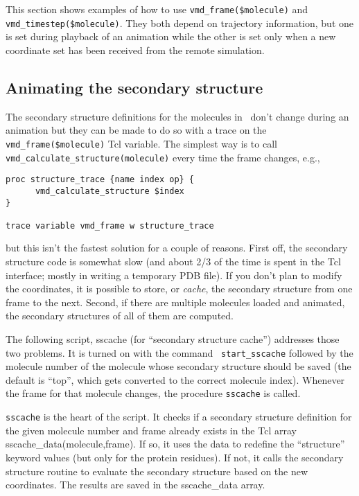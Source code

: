 This section shows examples of how to use {\tt vmd\_frame(\$molecule)}
and {\tt vmd\_timestep(\$molecule)}. 
They both depend
on trajectory information, but one is set during playback of an
animation while the other is set only when a new coordinate
set has been received from the remote simulation.


\subsection{Animating the secondary structure}

The secondary structure definitions for the molecules in \VMD\ don't
change during an animation but they can be made to do so with a trace
on the {\tt vmd\_frame(\$molecule)} Tcl variable.  The simplest way
is to call {\tt vmd\_calculate\_structure(molecule)} every time the
frame changes, e.g.,

\begin{verbatim}
proc structure_trace {name index op} {
      vmd_calculate_structure $index
}

trace variable vmd_frame w structure_trace
\end{verbatim}
but this isn't the fastest solution for a couple of reasons.  First
off, the secondary structure code is somewhat slow (and about 2/3 of
the time is spent in the Tcl interface; mostly in writing a temporary
PDB file).  If you don't plan to modify the coordinates, it is possible to
store, or {\it cache}, the secondary structure from one frame to the
next.  Second, if there are multiple molecules loaded and animated,
the secondary structures of all of them are computed.

  The following script, sscache (for ``secondary structure cache'')
addresses those two problems.  It is turned on with the command {\tt
start\_sscache} followed by the molecule number of the molecule whose
secondary structure should be saved (the default is ``top'', which
gets converted to the correct molecule index).  Whenever the frame for
that molecule changes, the procedure {\tt sscache} is called.

  {\tt sscache} is the heart of the script.  It checks if a secondary
structure definition for the given molecule number and frame already
exists in the Tcl array sscache\_data(molecule,frame).  If so, it uses
the data to redefine the ``structure'' keyword values (but only for
the protein residues).  If not, it calls the secondary structure
routine to evaluate the secondary structure based on the new
coordinates.  The results are saved in the sscache\_data array.

